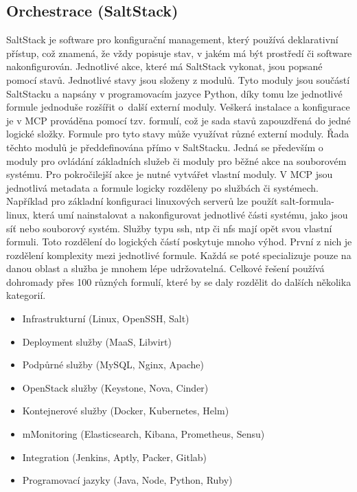 \subsection{Orchestrace (SaltStack)}
SaltStack je software pro konfigurační management, který používá deklarativní přístup, což znamená, že vždy popisuje stav, v jakém má být prostředí či software nakonfigurován. Jednotlivé akce, které má SaltStack vykonat, jsou popsané pomocí stavů. Jednotlivé stavy jsou složeny z modulů. Tyto moduly jsou součástí SaltStacku a napsány v programovacím jazyce Python, díky tomu lze jednotlivé formule jednoduše rozšířit o další externí moduly. Veškerá instalace a konfigurace je v MCP prováděna pomocí tzv. formulí, což je sada stavů zapouzdřená do jedné logické složky. Formule pro tyto stavy může využívat různé externí moduly. Řada těchto modulů je předdefinována přímo v SaltStacku. Jedná se především o moduly pro ovládání základních služeb či moduly pro běžné akce na souborovém systému. Pro pokročilejší akce je nutné vytvářet vlastní moduly. V MCP jsou jednotlivá metadata a formule logicky rozděleny po službách či systémech. Například pro základní konfiguraci linuxových serverů lze použít salt-formula-linux, která umí nainstalovat a nakonfigurovat jednotlivé části systému, jako jsou síť nebo souborový systém. Služby typu ssh, ntp či nfs mají opět svou vlastní formuli. Toto rozdělení do logických částí poskytuje mnoho výhod. První z nich je rozdělení komplexity mezi jednotlivé formule. Každá se poté specializuje pouze na danou oblast a služba je mnohem lépe udržovatelná. Celkové řešení používá dohromady přes 100 různých formulí, které by se daly rozdělit do dalších několika kategorií.

\begin{itemize}
    \item Infrastrukturní (Linux, OpenSSH, Salt)
    \item Deployment služby (MaaS, Libvirt)
    \item Podpůrné služby (MySQL, Nginx, Apache)
    \item OpenStack služby (Keystone, Nova, Cinder)
    \item Kontejnerové služby (Docker, Kubernetes, Helm)
    \item mMonitoring (Elasticsearch, Kibana, Prometheus, Sensu)
    \item Integration (Jenkins, Aptly, Packer, Gitlab)
    \item Programovací jazyky (Java, Node, Python, Ruby)
\end{itemize}

